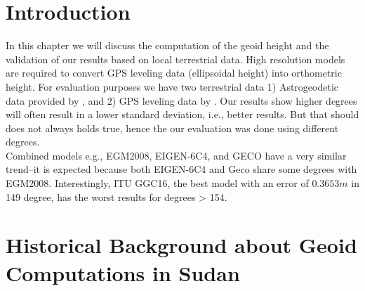 \section{Introduction}
In this chapter we will discuss the computation of the geoid height and the validation of our results based on local terrestrial data. High resolution models are required to convert GPS leveling data (ellipsoidal height) into orthometric height. For evaluation purposes we have two terrestrial data 1) Astrogeodetic data provided by \cite{osman}, and 2) GPS leveling data by \cite{ahmed_data}. Our results show higher degrees will often result in a lower standard deviation, i.e., better results. But that should does not always holds true, hence the our evaluation was done using different degrees.
\\
 Combined models e.g., EGM2008, EIGEN-6C4, and GECO have a very similar trend--it is expected because both EIGEN-6C4 and Geco share some degrees with EGM2008. Interestingly, ITU GGC16, the best model with an error of $0.3653m$ in 149 degree, has the worst results for degrees > 154.



\section{Historical Background about Geoid Computations in Sudan}

